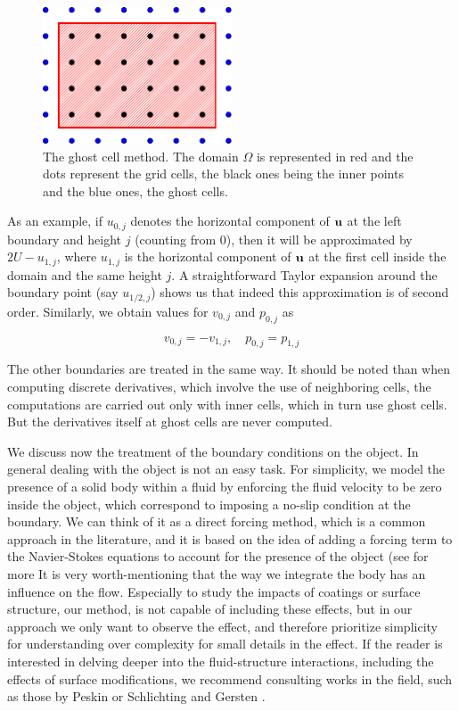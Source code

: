 \begin{figure}[h]
  \centering
  \includegraphics[width=0.5\textwidth]{0_graphics/methods/grid.pdf}
  \caption{The ghost cell method. The domain $\Omega$ is represented in red and the dots represent the grid cells, the black ones being the inner points and the blue ones, the ghost cells.}
  \label{fig: ghostCells}
\end{figure}

As an example, if $u_{0,j}$ denotes the horizontal component of $\boldsymbol{\mathrm{u}}$ at the left boundary and height $j$ (counting from 0), then it will be approximated by $2U-u_{1,j}$, where $u_{1,j}$ is the horizontal component of $\boldsymbol{\mathrm{u}}$ at the first cell inside the domain and the same height $j$. A straightforward Taylor expansion around the boundary point (say $u_{1/2,j}$) shows us that indeed this approximation is of second order.
Similarly, we obtain values for $v_{0,j}$ and $p_{0,j}$ as

$$
  v_{0,j} = -v_{1,j}, \quad p_{0,j} = p_{1,j}
$$

The other boundaries are treated in the same way. It should be noted than when computing discrete derivatives, which involve the use of neighboring cells, the computations are carried out only with inner cells, which in turn use ghost cells. But the derivatives itself at ghost cells are never computed.

We discuss now the treatment of the boundary conditions on the object. In general dealing with the object is not an easy task. For simplicity, we model the presence of a solid body within a fluid by enforcing the fluid velocity to be zero inside the object, which correspond to imposing a no-slip condition at the boundary. We can think of it as a direct forcing method, which is a common approach in the literature, and it is based on the idea of adding a forcing term to the Navier-Stokes equations to account for the presence of the object (see \cite{forcing} for more
It is very worth-mentioning that the way we integrate the body has an influence on the flow. Especially to study the impacts of coatings or surface structure, our method, is not capable of including these effects, but in our approach we only want to observe the effect, and therefore prioritize simplicity for understanding over complexity for small details in the effect. If the reader is interested in delving deeper into the fluid-structure interactions, including the effects of surface modifications, we recommend consulting works in the field, such as those by Peskin \cite{Peskin1977ImmersedBM} or Schlichting and Gersten \cite{Schlichting2000BoundaryLayerT}.

